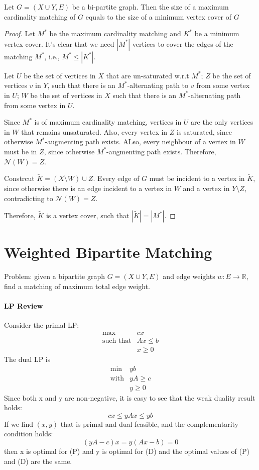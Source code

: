 \begin{theorem}
Let $G=(X\cup Y,E)$ be a bi-partite graph.
Then the size of a maximum cardinality matching of $G$ equals to the size of a minimum vertex cover of $G$
\end{theorem}
\begin{proof}
Let $M^*$ be the maximum cardinality matching and $K^*$ be a minimum vertex cover.
It's clear that we need $|M^*|$ vertices to cover the edges of the matching $M^*$, i.e., $M^*\le|K^*|$.

Let $U$ be the set of vertices in $X$ that are un-saturated w.r.t $M^*$; 
$Z$ be the set of vertices $v$ in $Y$, such that there is an $M^*$-alternating path to $v$ from some vertex in $U$;
$W$ be the set of vertices in $X$ such that there is an $M^*$-alternating path from some vertex in $U$.

Since $M^*$ is of maximum cardinality matching, vertices in $U$ are the only vertices in $W$ that remains unsaturated.
Also, every vertex in $Z$ is saturated, since otherwise $M^*$-augmenting path exists. ALso, every neighbour of a vertex in $W$ must be in $Z$, since otherwise $M^*$-augmenting path exists.
Therefore, $\mathcal{N}(W)=Z$.

Constrcut $\tilde{K}=(X\setminus W)\cup Z$. Every edge of $G$ must be incident to a vertex in $\tilde{K}$, since otherwise there is an edge incident to a vertex in $W$ and a vertex in $Y\setminus Z$, contradicting to $\mathcal{N}(W)=Z$.

Therefore, $\tilde{K}$ is a vertex cover, such that $|\tilde{K}|=|M^*|$.
\end{proof}

\section{Weighted Bipartite Matching}
Problem: given a bipartite graph $G=(X\cup Y,E)$ and edge weights $w:E\to\mathbb{R}$, find a matching of maximum total edge weight.

\paragraph{LP Review}
Consider the primal LP:
\[
\begin{array}{ll}
\max&cx\\
\text{such that}&Ax\le b\\
&x\ge0
\end{array}
\]
The dual LP is 
\[
\begin{array}{ll}
\min&yb\\
\text{with}&yA\ge c\\
&y\ge0
\end{array}
\]
Since both x and y are non-negative, it is easy to see that the weak duality result holds:
\[
cx\le yAx\le yb
\]
If we find $(x,y)$ that is primal and dual feasible, and the complementarity condition holds:
\[
(yA-c)x=y(Ax-b)=0
\]
then x is optimal for (P) and y is optimal for (D) and the optimal values
of (P) and (D) are the same.

